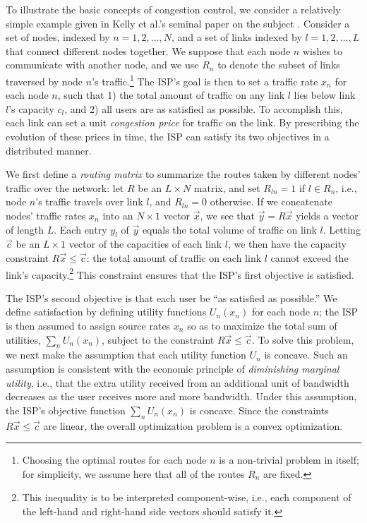 To illustrate the basic concepts of congestion control, we consider a relatively simple example given in Kelly et al.'s seminal paper on the subject \cite{kelly1998rate}. Consider a set of nodes, indexed by $n = 1,2,\ldots,N$, and a set of links indexed by $l = 1,2,\ldots,L$ that connect different nodes together. We suppose that each node $n$ wishes to communicate with another node, and we use $R_n$ to denote the subset of links traversed by node $n$'s traffic.\footnote{Choosing the optimal routes for each node $n$ is a non-trivial problem in itself; for simplicity, we assume here that all of the routes $R_n$ are fixed.} The ISP's goal is then to set a traffic rate $x_n$ for each node $n$, such that 1) the total amount of traffic on any link $l$ lies below link $l$'s capacity $c_l$, and 2) all users are as satisfied as possible. To accomplish this, each link can set a unit \emph{congestion price} for traffic on the link. By prescribing the evolution of these prices in time, the ISP can satisfy its two objectives in a distributed manner.

We first define a \emph{routing matrix} to summarize the routes taken by different nodes' traffic over the network: let $R$ be an $L\times N$ matrix, and set $R_{ln} = 1$ if $l\in R_n$, i.e., node $n$'s traffic travels over link $l$, and $R_{ln} = 0$ otherwise. If we concatenate nodes' traffic rates $x_n$ into an $N\times 1$ vector $\vec{x}$, we see that $\vec{y} = R\vec{x}$ yields a vector of length $L$. Each entry $y_l$ of $\vec{y}$ equals the total volume of traffic on link $l$. Letting $\vec{c}$ be an $L\times 1$ vector of the capacities of each link $l$, we then have the capacity constraint $R\vec{x} \leq \vec{c}$: the total amount of traffic on each link $l$ cannot exceed the link's capacity.\footnote{This inequality is to be interpreted component-wise, i.e., each component of the left-hand and right-hand side vectors should satisfy it.} This constraint ensures that the ISP's first objective is satisfied.

The ISP's second objective is that each user be ``as satisfied as possible.'' We define satisfaction by defining utility functions $U_n(x_n)$ for each node $n$; the ISP is then assumed to assign source rates $x_n$ so as to maximize the total sum of utilities, $\sum_n U_n(x_n)$, subject to the constraint $R\vec{x} \leq \vec{c}$. To solve this problem, we next make the assumption that each utility function $U_n$ is concave. Such an assumption is consistent with the economic principle of \emph{diminishing marginal utility}, i.e., that the extra utility received from an additional unit of bandwidth decreases as the user receives more and more bandwidth. Under this assumption, the ISP's objective function $\sum_n U_n(x_n)$ is concave. Since the constraints $R\vec{x}\leq \vec{c}$ are linear, the overall optimization problem is a convex optimization.

